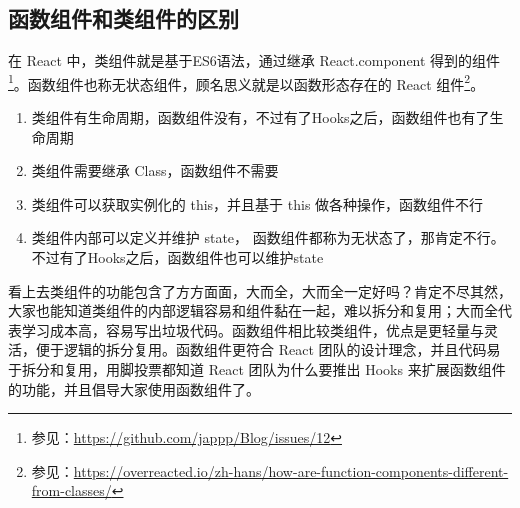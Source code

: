 \documentclass[../../../interview-questions.tex]{subfiles}
\begin{document}
\subsection{函数组件和类组件的区别}

在 React 中，类组件就是基于ES6语法，通过继承 React.component 得到的组件\footnote{参见：\url{https://github.com/jappp/Blog/issues/12}}。函数组件也称无状态组件，顾名思义就是以函数形态存在的 React 组件\footnote{参见：\url{https://overreacted.io/zh-hans/how-are-function-components-different-from-classes/}}。

\begin{enumerate}
    \item{类组件有生命周期，函数组件没有，不过有了Hooks之后，函数组件也有了生命周期}
    \item{类组件需要继承 Class，函数组件不需要}
    \item{类组件可以获取实例化的 this，并且基于 this 做各种操作，函数组件不行}
    \item {类组件内部可以定义并维护 state， 函数组件都称为无状态了，那肯定不行。不过有了Hooks之后，函数组件也可以维护state} 
\end{enumerate}

看上去类组件的功能包含了方方面面，大而全，大而全一定好吗？肯定不尽其然，大家也能知道类组件的内部逻辑容易和组件黏在一起，难以拆分和复用；大而全代表学习成本高，容易写出垃圾代码。函数组件相比较类组件，优点是更轻量与灵活，便于逻辑的拆分复用。函数组件更符合 React 团队的设计理念，并且代码易于拆分和复用，用脚投票都知道 React 团队为什么要推出 Hooks 来扩展函数组件的功能，并且倡导大家使用函数组件了。
\end{document}
